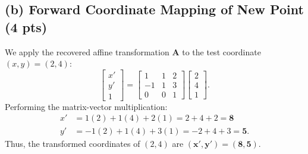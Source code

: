 \documentclass[11pt,a4paper]{article}
\begin{document}
\subsection{(b) Forward Coordinate Mapping of New Point (4 pts)}
We apply the recovered affine transformation $\mathbf{A}$ to the test coordinate $(x, y) = (2, 4)$:
\begin{equation}
\begin{bmatrix} x' \\ y' \\ 1 \end{bmatrix} = \begin{bmatrix} 1 & 1 & 2 \\ -1 & 1 & 3 \\ 0 & 0 & 1 \end{bmatrix} \begin{bmatrix} 2 \\ 4 \\ 1 \end{bmatrix}.
\end{equation}
Performing the matrix-vector multiplication:
\begin{align}
x' &= 1(2) + 1(4) + 2(1) = 2 + 4 + 2 = \mathbf{8} \\
y' &= -1(2) + 1(4) + 3(1) = -2 + 4 + 3 = \mathbf{5}.
\end{align}
Thus, the transformed coordinates of $(2, 4)$ are $\mathbf{(x', y') = (8, 5)}$.
\end{document}

